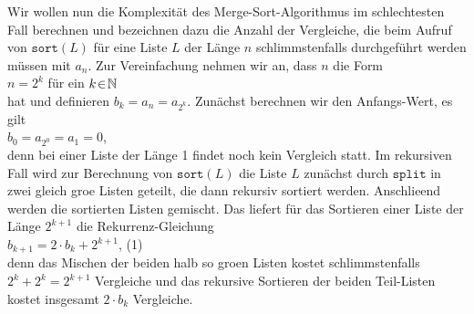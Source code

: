 \noindent
Wir wollen nun die Komplexit\"at des Merge-Sort-Algorithmus im schlechtesten Fall berechnen und bezeichnen 
dazu die Anzahl der Vergleiche, die beim Aufruf von
$\mathtt{sort}(L)$ f\"ur eine Liste $L$ der L\"ange $n$
schlimmstenfalls durchgef\"uhrt werden m\"ussen mit $a_n$.  
Zur Vereinfachung nehmen wir an, dass $n$ die Form \\[0.2cm]
\hspace*{1.3cm} $\displaystyle n = 2^k$ \qquad f\"ur ein $k \!\in\! \mathbb{N}$ \\[0.2cm]
hat und definieren $b_k = a_n = a_{2^k}$.  Zun\"achst berechnen wir den Anfangs-Wert, es gilt
\\[0.2cm]
\hspace*{1.3cm}
$\displaystyle b_0 = a_{2^0} = a_1 = 0$, 
\\[0.2cm]
denn bei einer Liste der L\"ange 1 findet noch kein Vergleich statt.
Im rekursiven Fall wird zur Berechnung
von $\mathtt{sort}(L)$ die Liste $L$ zun\"achst durch $\texttt{split}$ in zwei
gleich gro\3e Listen geteilt, die dann rekursiv sortiert werden. Anschlie\3end
werden die sortierten Listen
gemischt.  Das liefert f\"ur das Sortieren einer Liste der L\"ange $2^{k+1}$ die Rekurrenz-Gleichung \\[0.2cm]
\hspace*{1.3cm} $b_{k+1} = 2 \cdot b_k + 2^{k+1}$, \hspace*{\fill} (1) \\[0.2cm]
denn das Mischen der beiden halb so gro\3en Listen kostet schlimmstenfalls $2^k +
2^k = 2^{k+1}$ Vergleiche 
und das rekursive Sortieren der beiden Teil-Listen
kostet insgesamt $2 \cdot b_k$ Vergleiche.

